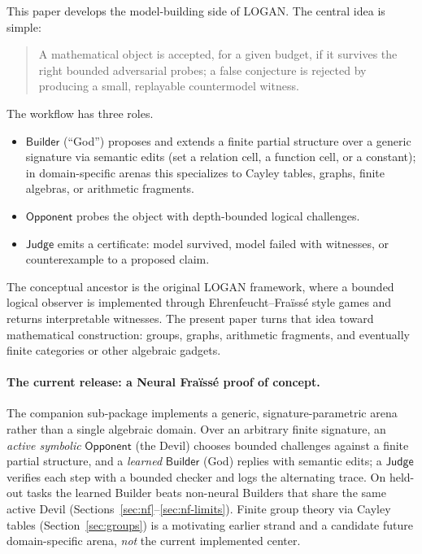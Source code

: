\documentclass[11pt]{article}
\newcommand{\LOGAN}{\textsc{LOGAN}}
\newcommand{\Builder}{\ensuremath{\mathsf{Builder}}}
\newcommand{\Opponent}{\ensuremath{\mathsf{Opponent}}}
\newcommand{\Judge}{\ensuremath{\mathsf{Judge}}}
\begin{document}
This paper develops the model-building side of \LOGAN{}.  The central idea is simple:
\begin{quote}
A mathematical object is accepted, for a given budget, if it survives the right bounded adversarial probes; a false conjecture is rejected by producing a small, replayable countermodel witness.
\end{quote}

The workflow has three roles.
\begin{itemize}[leftmargin=2em]
  \item \Builder{} (``God'') proposes and extends a finite partial structure over a generic signature via semantic edits (set a relation cell, a function cell, or a constant); in domain-specific arenas this specializes to Cayley tables, graphs, finite algebras, or arithmetic fragments.
  \item \Opponent{} probes the object with depth-bounded logical challenges.
  \item \Judge{} emits a certificate: model survived, model failed with witnesses, or counterexample to a proposed claim.
\end{itemize}

The conceptual ancestor is the original \LOGAN{} framework, where a bounded logical observer is implemented through Ehrenfeucht--Fra\"iss\'e style games and returns interpretable witnesses.  The present paper turns that idea toward mathematical construction: groups, graphs, arithmetic fragments, and eventually finite categories or other algebraic gadgets.

\paragraph{The current release: a Neural Fra\"iss\'e proof of concept.}
The companion sub-package implements a generic, signature-parametric arena rather than a single algebraic domain.  Over an arbitrary finite signature, an \emph{active symbolic} \Opponent{} (the Devil) chooses bounded challenges against a finite partial structure, and a \emph{learned} \Builder{} (God) replies with semantic edits; a \Judge{} verifies each step with a bounded checker and logs the alternating trace.  On held-out tasks the learned Builder beats non-neural Builders that share the same active Devil (Sections~\ref{sec:nf}--\ref{sec:nf-limits}).  Finite group theory via Cayley tables (Section~\ref{sec:groups}) is a motivating earlier strand and a candidate future domain-specific arena, \emph{not} the current implemented center.
\end{document}
